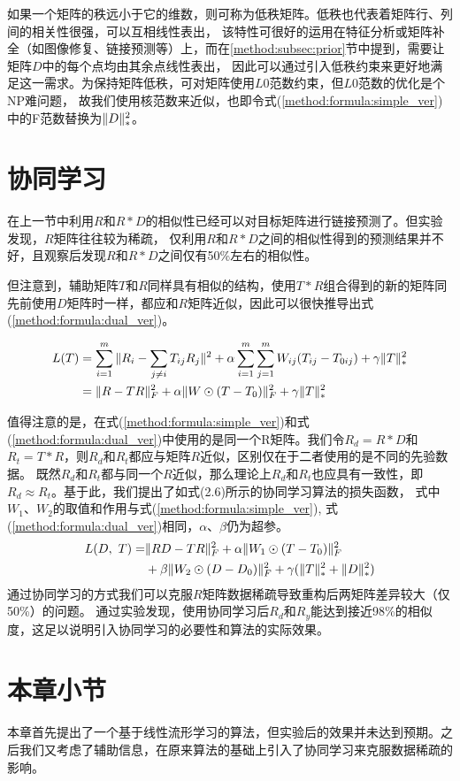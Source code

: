 如果一个矩阵的秩远小于它的维数，则可称为低秩矩阵。低秩也代表着矩阵行、列间的相关性很强，可以互相线性表出，
该特性可很好的运用在特征分析或矩阵补全（如图像修复、链接预测等）上，而在\ref{method:subsec:prior}节中提到，需要让矩阵$D$中的每个点均由其余点线性表出，
因此可以通过引入低秩约束来更好地满足这一需求。为保持矩阵低秩，可对矩阵使用$L0$范数约束，但$L0$范数的优化是个NP难问题，
故我们使用核范数来近似，也即令式(\ref{method:formula:simple_ver})中的F范数替换为$\Arrowvert{D}\Arrowvert_*^2$。


\section{协同学习}
\label{method:sec:collaborative}
在上一节中利用$R$和$R*D$的相似性已经可以对目标矩阵进行链接预测了。但实验发现，$R$矩阵往往较为稀疏，
仅利用$R$和$R*D$之间的相似性得到的预测结果并不好，且观察后发现$R$和$R*D$之间仅有50\%左右的相似性。


但注意到，辅助矩阵$T$和$R$同样具有相似的结构，使用$T*R$组合得到的新的矩阵同先前使用$D$矩阵时一样，都应和$R$矩阵近似，因此可以很快推导出式(\ref{method:formula:dual_ver})。

\begin{align}
L(T)&=\sum_{i=1}^m\Arrowvert{R_i-\sum_{j\neq{i}} T_{ij}R_j }\Arrowvert^2 
+\alpha\sum_{i=1}^m\sum_{j=1}^mW_{ij}(T_{ij}-T_{0ij})+\gamma\Arrowvert{T}\Arrowvert_*^2 \nonumber \\
    &=\Arrowvert{R-TR}\Arrowvert_F^2+\alpha\Arrowvert{W}\odot(T-T_0)\Arrowvert_F^2+\gamma\Arrowvert{T}\Arrowvert_*^2
    \label{method:formula:dual_ver}
\end{align}


值得注意的是，在式(\ref{method:formula:simple_ver})和式(\ref{method:formula:dual_ver})中使用的是同一个R矩阵。我们令$R_d=R*D$和$R_t = T*R$，则$R_d$和$R_t$都应与矩阵$R$近似，区别仅在于二者使用的是不同的先验数据。
既然$R_d$和$R_t$都与同一个$R$近似，那么理论上$R_d$和$R_t$也应具有一致性，即$R_d \approx R_t$。基于此，我们提出了如式(2.6)所示的协同学习算法的损失函数，
式中$W_1$、$W_2$的取值和作用与式(\ref{method:formula:simple_ver}), 式(\ref{method:formula:dual_ver})相同，$\alpha$、$\beta$仍为超参。
\begin{align}
L(D,\ T)=&\Arrowvert{RD-TR}\Arrowvert_F^2+\alpha\Arrowvert{W_1}\odot(T-T_0)\Arrowvert_F^2 \nonumber\\
        &+\beta\Arrowvert{W_2}\odot(D-D_0)\Arrowvert_F^2+ \gamma(\Arrowvert{T}\Arrowvert_*^2+\Arrowvert{D}\Arrowvert_*^2)
\end{align}
通过协同学习的方式我们可以克服$R$矩阵数据稀疏导致重构后两矩阵差异较大（仅50\%）的问题。
通过实验发现，使用协同学习后$R_d$和$R_y$能达到接近98\%的相似度，这足以说明引入协同学习的必要性和算法的实际效果。

\section{本章小节}
本章首先提出了一个基于线性流形学习的算法，但实验后的效果并未达到预期。之后我们又考虑了辅助信息，在原来算法的基础上引入了协同学习来克服数据稀疏的影响。
